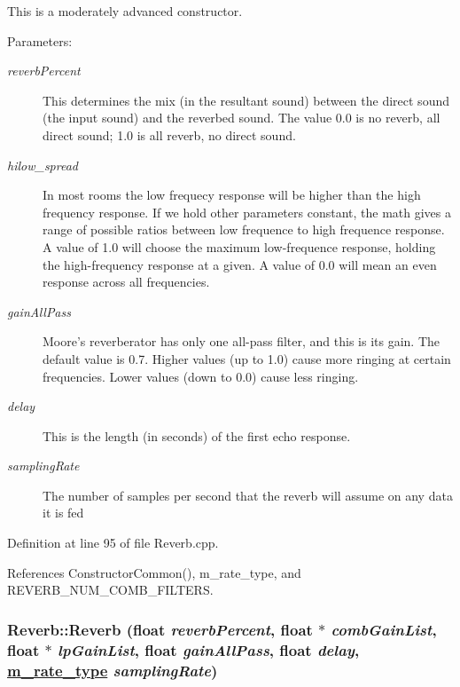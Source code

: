 This is a moderately advanced constructor. \begin{Desc}
\item[Parameters:]
\begin{description}
\item[{\em reverb\-Percent}]This determines the mix (in the resultant sound) between the direct sound (the input sound) and the reverbed sound. The value 0.0 is no reverb, all direct sound; 1.0 is all reverb, no direct sound. \item[{\em hilow\_\-spread}]In most rooms the low frequecy response will be higher than the high frequency response. If we hold other parameters constant, the math gives a range of possible ratios between low frequence to high frequence response. A value of 1.0 will choose the maximum low-frequence response, holding the high-frequency response at a given. A value of 0.0 will mean an even response across all frequencies. \item[{\em gain\-All\-Pass}]Moore's reverberator has only one all-pass filter, and this is its gain. The default value is 0.7. Higher values (up to 1.0) cause more ringing at certain frequencies. Lower values (down to 0.0) cause less ringing. \item[{\em delay}]This is the length (in seconds) of the first echo response. \item[{\em sampling\-Rate}]The number of samples per second that the reverb will assume on any data it is fed \end{description}
\end{Desc}


Definition at line 95 of file Reverb.cpp.

References Constructor\-Common(), m\_\-rate\_\-type, and REVERB\_\-NUM\_\-COMB\_\-FILTERS.\hypertarget{classReverb_a3}{
\subsubsection[Reverb]{\setlength{\rightskip}{0pt plus 5cm}Reverb::Reverb (float {\em reverb\-Percent}, float $\ast$ {\em comb\-Gain\-List}, float $\ast$ {\em lp\-Gain\-List}, float {\em gain\-All\-Pass}, float {\em delay}, \hyperlink{Types_8h_a4}{m\_\-rate\_\-type} {\em sampling\-Rate})}}
\label{classReverb_a3}


